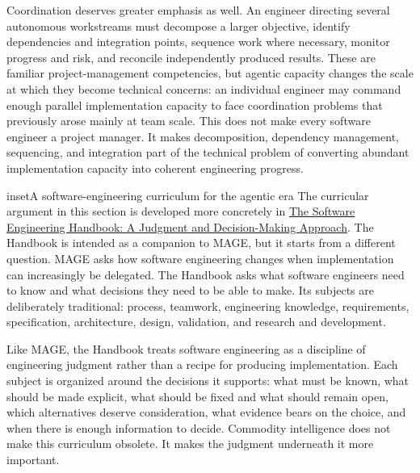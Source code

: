 Coordination deserves greater emphasis as well. An engineer directing several autonomous workstreams must decompose a larger objective, identify dependencies and integration points, sequence work where necessary, monitor progress and risk, and reconcile independently produced results. These are familiar project-management competencies, but agentic capacity changes the scale at which they become technical concerns: an individual engineer may command enough parallel implementation capacity to face coordination problems that previously arose mainly at team scale. This does not make every software engineer a project manager. It makes decomposition, dependency management, sequencing, and integration part of the technical problem of converting abundant implementation capacity into coherent engineering progress.




\begin{bookbox}{inset}{A software-engineering curriculum for the agentic era}
\label{inset-se-handbook-curriculum}
The curricular argument in this section is developed more concretely in \href{https://davisjam.github.io/model-based-agentic-software-engineering/book/se-handbook/index.html}{The Software Engineering Handbook: A Judgment and Decision-Making Approach}. The Handbook is intended as a companion to MAGE, but it starts from a different question. MAGE asks how software engineering changes when implementation can increasingly be delegated. The Handbook asks what software engineers need to know and what decisions they need to be able to make. Its subjects are deliberately traditional: process, teamwork, engineering knowledge, requirements, specification, architecture, design, validation, and research and development.

Like MAGE, the Handbook treats software engineering as a discipline of engineering judgment rather than a recipe for producing implementation. Each subject is organized around the decisions it supports: what must be known, what should be made explicit, what should be fixed and what should remain open, which alternatives deserve consideration, what evidence bears on the choice, and when there is enough information to decide. Commodity intelligence does not make this curriculum obsolete. It makes the judgment underneath it more important.
\end{bookbox}


